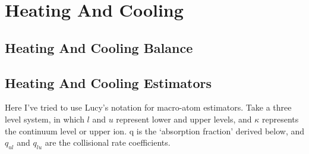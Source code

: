 

\section{Heating And Cooling}

\subsection{Heating And Cooling Balance}

\subsection{Heating And Cooling Estimators}


Here I've tried to use Lucy's notation for macro-atom estimators. Take a three level system, in
which $l$ and $u$ represent lower and upper levels, 
and $\kappa$ represents the continuum level or upper ion.
q is the `absorption fraction' derived below, and $q_{ul}$ and $q_{lu}$ are the collisional
rate coefficients.

